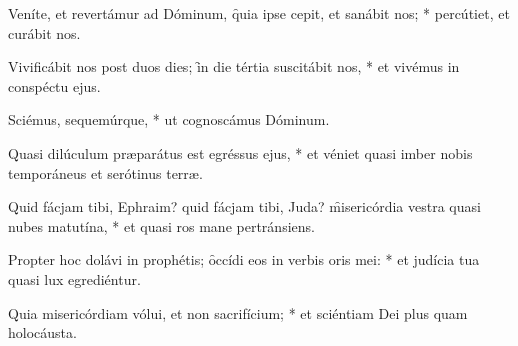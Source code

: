 \begin{psalmus}

		Veníte, et revertámur ad Dóminum, \f quia ipse cepit, et sanábit nos; * percútiet, et curábit nos.

		Vivificábit nos post duos dies; \f in die tértia suscitábit nos, * et vivémus in conspéctu ejus.

		Sciémus, sequemúrque, * ut cognoscámus Dóminum.

		Quasi dilúculum præparátus est egréssus ejus, * et véniet quasi imber nobis temporáneus et serótinus terræ.

		Quid fácjam tibi, Ephraim? quid fácjam tibi, Juda? \f misericórdia vestra quasi nubes matutína, * et quasi ros mane pertránsiens.

		Propter hoc dolávi in prophétis; \f occídi eos in verbis oris mei: * et judícia tua quasi lux egrediéntur.

		Quia misericórdiam vólui, et non sacrifícium; * et sciéntiam Dei plus quam holocáusta.

\end{psalmus}
